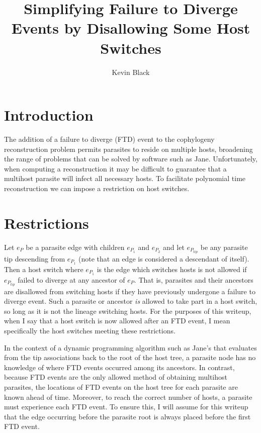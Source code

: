\documentclass{article}
\title{Simplifying Failure to Diverge Events by Disallowing Some Host Switches}
\author{Kevin Black}
\begin{document}
\maketitle

\section{Introduction}
The addition of a failure to diverge (FTD) event to the cophylogeny reconstruction problem permits parasites to reside on multiple hosts, broadening the range of problems that can be solved by software such as Jane. Unfortunately, when computing a reconstruction it may be difficult to guarantee that a multihost parasite will infect all necessary hosts. To facilitate polynomial time reconstruction we can impose a restriction on host switches.

\section{Restrictions}

Let $e_{P}$ be a parasite edge with children $e_{P_{1}}$ and $e_{P_{2}}$ and let $e_{P_{tip}}$ be any parasite tip descending from $e_{P_{1}}$ (note that an edge is considered a descendant of itself). Then a host switch where $e_{P_{1}}$ is the edge which switches hosts is not allowed if $e_{P_{tip}}$ failed to diverge at any ancestor of $e_{P}$. That is, parasites and their ancestors are disallowed from switching hosts if they have previously undergone a failure to diverge event. Such a parasite or ancestor \emph{is} allowed to take part in a host switch, so long as it is not the lineage switching hosts. For the purposes of this writeup, when I say that a host switch is now allowed after an FTD event, I mean specifically the host switches meeting these restrictions.

In the context of a dynamic programming algorithm such as Jane's that evaluates from the tip associations back to the root of the host tree, a parasite node has no knowledge of where FTD events occurred among its ancestors. In contrast, because FTD events are the only allowed method of obtaining multihost parasites, the locations of FTD events on the host tree for each parasite are known ahead of time. Moreover, to reach the correct number of hosts, a parasite must experience each FTD event. To ensure this, I will assume for this writeup that the edge occurring before the parasite root is always placed before the first FTD event. 
\end{document}
